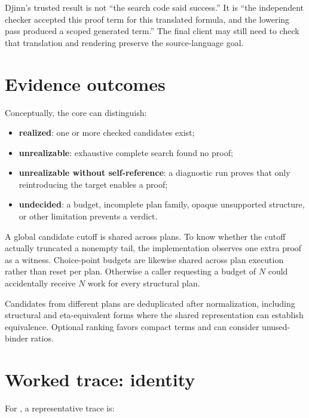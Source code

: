 \documentclass[10pt,letterpaper,oneside]{report}
\newcommand{\code}[1]{\texttt{\detokenize{#1}}}
\newcommand{\term}[1]{\textbf{#1}}
\begin{document}
\begin{invariantbox}
Djinn's trusted result is not ``the search code said success.'' It is ``the independent checker accepted this proof term for this translated formula, and the lowering pass produced a scoped generated term.'' The final client may still need to check that translation and rendering preserve the source-language goal.
\end{invariantbox}

\section{Evidence outcomes}

Conceptually, the core can distinguish:

\begin{itemize}
  \item \term{realized}: one or more checked candidates exist;
  \item \term{unrealizable}: exhaustive complete search found no proof;
  \item \term{unrealizable without self-reference}: a diagnostic run proves that only reintroducing the target enables a proof;
  \item \term{undecided}: a budget, incomplete plan family, opaque unsupported structure, or other limitation prevents a verdict.
\end{itemize}

A global candidate cutoff is shared across plans. To know whether the cutoff actually truncated a nonempty tail, the implementation observes one extra proof as a witness. Choice-point budgets are likewise shared across plan execution rather than reset per plan. Otherwise a caller requesting a budget of \(N\) could accidentally receive \(N\) work for every structural plan.

Candidates from different plans are deduplicated after normalization, including structural and eta-equivalent forms where the shared representation can establish equivalence. Optional ranking favors compact terms and can consider unused-binder ratios.

\section{Worked trace: identity}

For \code{forall a. a -> a}, a representative trace is:
\end{document}
